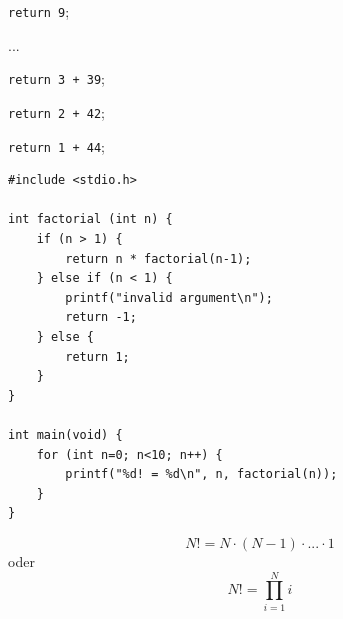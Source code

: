 
\begin{frame}
%
\scriptsize
\begin{codebox}
\begin{codebox}
\begin{codebox}
\begin{codebox}[Rekursionsstufe 3-7]
\begin{codebox}
\texttt{return 9};
\end{codebox}
...
\end{codebox}
\texttt{return 3 + 39};
\end{codebox}
\texttt{return 2 + 42};
\end{codebox}
\texttt{return 1 + 44};
\end{codebox}
%
\end{frame}


\begin{frame}[t,fragile]%
%
\begin{codebox}[Beispiel: Fakultät, equal height group = xmpFactorial]
\begin{verbatim}
#include <stdio.h>

int factorial (int n) {
    if (n > 1) {
        return n * factorial(n-1);
    } else if (n < 1) {
        printf("invalid argument\n"); 
        return -1;
    } else {
        return 1;
    }
}

int main(void) {
    for (int n=0; n<10; n++) {
        printf("%d! = %d\n", n, factorial(n));
    }
}
\end{verbatim}
\end{codebox}
%
\begin{hintbox}[Definition: Fakultät, equal height group = xmpFactorial]
\[N! = N \cdot (N-1) \cdot ... \cdot 1 \]
oder
\[N! = \prod_{i=1}^{N} i \]
\end{hintbox}
\end{frame}


